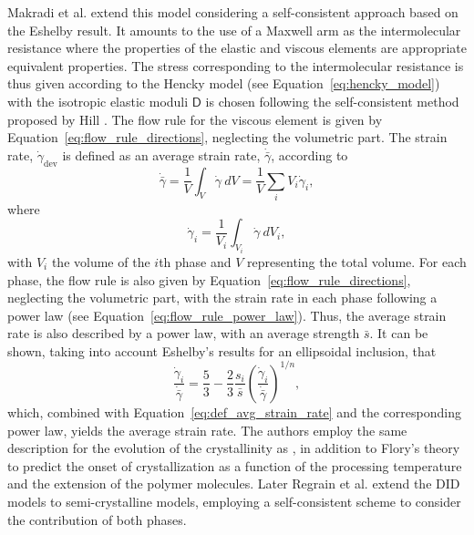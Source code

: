 Makradi et al. \citep{makradiTwophaseSelfconsistentModel2005} extend this model considering a self-consistent approach based on the Eshelby result.
It amounts to the use of a Maxwell arm as the intermolecular resistance where the properties of the elastic and viscous elements are appropriate equivalent properties.
The stress corresponding to the intermolecular resistance is thus given according to the Hencky model (see Equation~\eqref{eq:hencky_model}) with the isotropic elastic moduli $\bm{\mathsf D}$ is chosen following the self-consistent method proposed by Hill \citep{hillSelfconsistentMechanicsComposite1965}.
The flow rule for the viscous element is given by Equation~\eqref{eq:flow_rule_directions}, neglecting the volumetric part.
The strain rate, $\dot \gamma_\text{dev}$ is defined as an average strain rate, $\dot{\bar\gamma}$, according to
\begin{equation}
	\label{eq:def_avg_strain_rate}
	\dot{\bar\gamma} = \frac{1}{V}\int_V \dot \gamma\ dV = \frac{1}{V}\sum_i V_i \dot{\gamma}_i,
\end{equation}
where
\begin{equation}
	\dot \gamma_i = \frac{1}{V_i}\int_{V_i} \dot \gamma\ dV_i,
\end{equation}
with $V_i$ the volume of the $i$th phase and $V$ representing the total volume.
For each phase, the flow rule is also given by Equation~\eqref{eq:flow_rule_directions}, neglecting the volumetric part, with the strain rate in each phase following a power law (see Equation~\eqref{eq:flow_rule_power_law}).
Thus, the average strain rate is also described by a power law, with an average strength $\bar s$.
It can be shown, taking into account Eshelby's results for an ellipsoidal inclusion, that
\begin{equation}
	\frac{\dot \gamma_i}{\dot{\bar \gamma}} = \frac{5}{3} - \frac{2}{3}\frac{s_i}{\bar s} \left(\frac{\dot \gamma_i}{\dot{\bar \gamma}}\right)^{1/n},
\end{equation}
which, combined with Equation~\eqref{eq:def_avg_strain_rate} and the corresponding power law, yields the average strain rate.
The authors employ the same description for the evolution of the crystallinity as \cite{ahziModelingDeformationBehavior2003}, in addition to Flory's theory to predict the onset of crystallization as a function of the processing temperature and the extension of the polymer molecules.
Later Regrain et al. \citep{regrainMultimechanismModelsSemicrystalline2009} extend the DID models to semi-crystalline models, employing a self-consistent scheme to consider the contribution of both phases.

